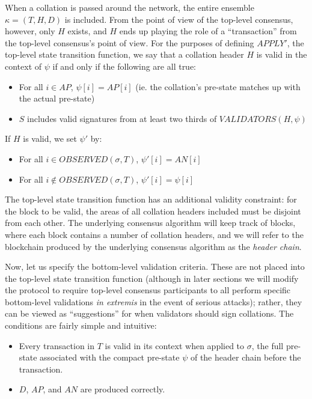 \documentclass[11pt,a4paper]{article}
\theoremstyle{plain}
\theoremstyle{definition}
\theoremstyle{remark}
\begin{document}
When a collation is passed around the network, the entire ensemble $\kappa = (T, H, D)$ is included. From the point of view of the top-level consensus, however, only $H$ exists, and $H$ ends up playing the role of a ``transaction'' from the top-level consensus's point of view. For the purposes of defining $APPLY'$, the top-level state transition function, we say that a collation header $H$ is valid in the context of $\psi$ if and only if the following are all true:

\begin{itemize}
\item
For all $i \in AP$, $\psi[i] = AP[i]$ (ie. the collation's pre-state matches up with the actual pre-state)
\item
$S$ includes valid signatures from at least two thirds of $VALIDATORS(H, \psi)$
\end{itemize}

If $H$ is valid, we set $\psi'$ by:

\begin{itemize}
\item
For all $i \in OBSERVED(\sigma, T)$, $\psi'[i] = AN[i]$
\item
For all $i \notin OBSERVED(\sigma, T)$, $\psi'[i] = \psi[i]$
\end{itemize}

The top-level state transition function has an additional validity constraint: for the block to be valid, the areas of all collation headers included must be disjoint from each other. The underlying consensus algorithm will keep track of blocks, where each block contains a number of collation headers, and we will refer to the blockchain produced by the underlying consensus algorithm as the \emph{header chain}.

Now, let us specify the bottom-level validation criteria. These are not placed into the top-level state transition function (although in later sections we will modify the protocol to require top-level consensus participants to all perform specific bottom-level validations \emph{in extremis} in the event of serious attacks); rather, they can be viewed as ``suggestions'' for when validators should sign collations. The conditions are fairly simple and intuitive:

\begin{itemize}
\item
Every transaction in $T$ is valid in its context when applied to $\sigma$, the full pre-state associated with the compact pre-state $\psi$ of the header chain before the transaction.
\item
$D$, $AP$, and $AN$ are produced correctly.
\end{itemize}
\end{document}
